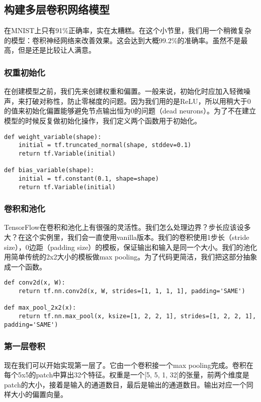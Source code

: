 \subsection{构建多层卷积网络模型}

在MNIST上只有91\%正确率，实在太糟糕。在这个小节里，我们用一个稍微复杂的模型：卷积神经网络来改善效果。这会达到大概99.2\%的准确率。虽然不是最高，但是还是比较让人满意。

\subsubsection{权重初始化}

在创建模型之前，我们先来创建权重和偏置。一般来说，初始化时应加入轻微噪声，来打破对称性，防止零梯度的问题。因为我们用的是ReLU，所以用稍大于0的值来初始化偏置能够避免节点输出恒为0的问题（dead neurons）。为了不在建立模型的时候反复做初始化操作，我们定义两个函数用于初始化。

\begin{lstlisting}
def weight_variable(shape):
    initial = tf.truncated_normal(shape, stddev=0.1)
    return tf.Variable(initial)

def bias_variable(shape):
    initial = tf.constant(0.1, shape=shape)
    return tf.Variable(initial)
\end{lstlisting}

\subsubsection{卷积和池化}

TensorFlow在卷积和池化上有很强的灵活性。我们怎么处理边界？步长应该设多大？在这个实例里，我们会一直使用vanilla版本。我们的卷积使用1步长（stride size），0边距（padding size）的模板，保证输出和输入是同一个大小。我们的池化用简单传统的2x2大小的模板做max pooling。为了代码更简洁，我们把这部分抽象成一个函数。

\begin{lstlisting}
def conv2d(x, W):
    return tf.nn.conv2d(x, W, strides=[1, 1, 1, 1], padding='SAME')

def max_pool_2x2(x):
    return tf.nn.max_pool(x, ksize=[1, 2, 2, 1], strides=[1, 2, 2, 1], padding='SAME')
\end{lstlisting}

\subsubsection{第一层卷积}

现在我们可以开始实现第一层了。它由一个卷积接一个max pooling完成。卷积在每个5x5的patch中算出32个特征。权重是一个[5, 5, 1, 32]的张量，前两个维度是patch的大小，接着是输入的通道数目，最后是输出的通道数目。输出对应一个同样大小的偏置向量。

